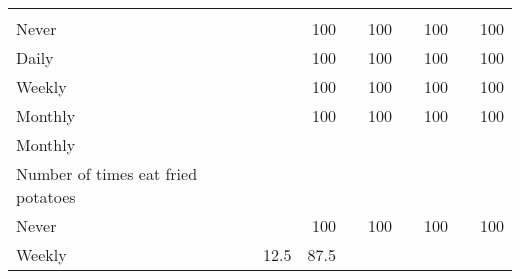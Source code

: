\documentclass{article}
\begin{document}
\begin{tabular}{lllllllll}
  \multicolumn{1}{r}{} &
  \multicolumn{1}{r}{} &
  \multicolumn{1}{r}{} \\
\multicolumn{1}{l}{\hspace{7em}Never} &
  \multicolumn{1}{|r}{} &
  \multicolumn{1}{r}{100} &
  \multicolumn{1}{r}{} &
  \multicolumn{1}{r}{100} &
  \multicolumn{1}{r}{} &
  \multicolumn{1}{r}{100} &
  \multicolumn{1}{r}{} &
  \multicolumn{1}{r}{100} \\
\multicolumn{1}{l}{\hspace{7em}Daily} &
  \multicolumn{1}{|r}{} &
  \multicolumn{1}{r}{100} &
  \multicolumn{1}{r}{} &
  \multicolumn{1}{r}{100} &
  \multicolumn{1}{r}{} &
  \multicolumn{1}{r}{100} &
  \multicolumn{1}{r}{} &
  \multicolumn{1}{r}{100} \\
\multicolumn{1}{l}{\hspace{7em}Weekly} &
  \multicolumn{1}{|r}{} &
  \multicolumn{1}{r}{100} &
  \multicolumn{1}{r}{} &
  \multicolumn{1}{r}{100} &
  \multicolumn{1}{r}{} &
  \multicolumn{1}{r}{100} &
  \multicolumn{1}{r}{} &
  \multicolumn{1}{r}{100} \\
\multicolumn{1}{l}{\hspace{7em}Monthly} &
  \multicolumn{1}{|r}{} &
  \multicolumn{1}{r}{100} &
  \multicolumn{1}{r}{} &
  \multicolumn{1}{r}{100} &
  \multicolumn{1}{r}{} &
  \multicolumn{1}{r}{100} &
  \multicolumn{1}{r}{} &
  \multicolumn{1}{r}{100} \\
\multicolumn{1}{l}{\hspace{5em}Monthly} &
  \multicolumn{1}{|r}{} &
  \multicolumn{1}{r}{} &
  \multicolumn{1}{r}{} &
  \multicolumn{1}{r}{} &
  \multicolumn{1}{r}{} &
  \multicolumn{1}{r}{} &
  \multicolumn{1}{r}{} &
  \multicolumn{1}{r}{} \\
\multicolumn{1}{l}{\hspace{6em}Number of times eat fried potatoes} &
  \multicolumn{1}{|r}{} &
  \multicolumn{1}{r}{} &
  \multicolumn{1}{r}{} &
  \multicolumn{1}{r}{} &
  \multicolumn{1}{r}{} &
  \multicolumn{1}{r}{} &
  \multicolumn{1}{r}{} &
  \multicolumn{1}{r}{} \\
\multicolumn{1}{l}{\hspace{7em}Never} &
  \multicolumn{1}{|r}{} &
  \multicolumn{1}{r}{100} &
  \multicolumn{1}{r}{} &
  \multicolumn{1}{r}{100} &
  \multicolumn{1}{r}{} &
  \multicolumn{1}{r}{100} &
  \multicolumn{1}{r}{} &
  \multicolumn{1}{r}{100} \\
\multicolumn{1}{l}{\hspace{7em}Weekly} &
  \multicolumn{1}{|r}{12.5} &
  \multicolumn{1}{r}{87.5} &

\end{tabular}
\end{document}
